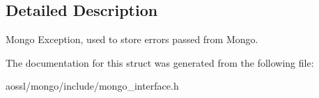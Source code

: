 \subsection{Detailed Description}
Mongo Exception, used to store errors passed from Mongo. 

The documentation for this struct was generated from the following file\+:\begin{DoxyCompactItemize}
\item 
aossl/mongo/include/mongo\+\_\+interface.\+h\end{DoxyCompactItemize}
